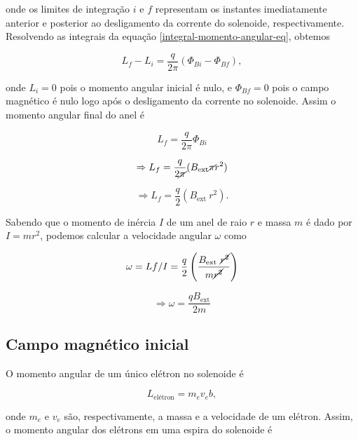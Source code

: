 \documentclass[
	article,
	11pt,
	oneside,
	a4paper,
	english,
	brazil,
	sumario=tradicional
	]{abntex2}
\begin{document}
\noindent onde os limites de integração $i$ e $f$ representam os instantes imediatamente anterior e posterior ao desligamento da corrente do solenoide, respectivamente. Resolvendo as integrais da equação \ref{integral-momento-angular-eq}, obtemos

\begin{equation}
    L_f - L_i = \frac{q}{2\pi}(\Phi_{Bi} - \Phi_{Bf}),
\end{equation}

\noindent onde $L_i = 0$ pois o momento angular inicial é nulo, e $\Phi_{Bf} = 0$ pois o campo magnético é nulo logo após o desligamento da corrente no solenoide. Assim o momento angular final do anel é

\begin{equation}
    L_f = \frac{q}{2\pi}\Phi_{Bi}
\end{equation}

\begin{equation}
    \Rightarrow L_f = \frac{q}{2\cancel{\pi}}(B_{\text{ext}}\cancel{\pi} r^2)
\end{equation}

\begin{equation}
    \Rightarrow L_f = \frac{q}{2}(B_{\text{ext}}~r^2).
\end{equation}

Sabendo que o momento de inércia $I$ de um anel de raio $r$ e massa $m$ é dado por $I = mr^2$, podemos calcular a velocidade angular $\omega$ como

\begin{equation}
    \omega = Lf/I = \frac{q}{2}\left(\frac{B_{\text{ext}}~\cancel{r^2}}{m\cancel{r^2}}\right)
\end{equation}

\begin{equation}
    \Rightarrow \omega = \frac{qB_{\text{ext}}}{2m}
\end{equation}

\subsection{Campo magnético inicial}

O momento angular de um único elétron no solenoide é

\begin{equation}
    L_{\text{elétron}} = m_e v_e b,
\end{equation}

\noindent onde $m_e$ e $v_e$ são, respectivamente, a massa e a velocidade de um elétron. Assim, o momento angular dos elétrons em uma espira do solenoide é
\end{document}

